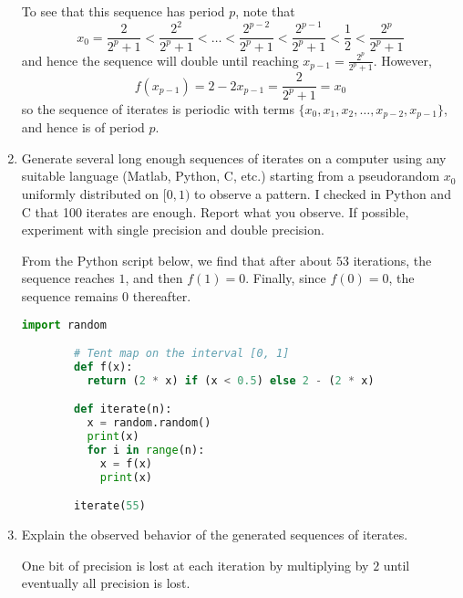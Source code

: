 \documentclass{../../../kin_math}
\begin{document}
\begin{questions}
\begin{enumerate}
\begin{solution}
      To see that this sequence has period $p$, note that
      \begin{equation*}
        x_0 = \frac{2}{2^p + 1} < \frac{2^2}{2^p + 1} < \dots < \frac{2^{p - 2}}{2^p + 1} < \frac{2^{p - 1}}{2^p + 1} < \frac{1}{2} < \frac{2^p}{2^p + 1}
      \end{equation*}
      and hence the sequence will double until reaching $x_{p - 1} = \frac{2^p}{2^p + 1}$. However,
      \begin{equation*}
        f(x_{p - 1}) = 2 - 2x_{p - 1} = \frac{2}{2^p + 1} = x_0
      \end{equation*}
      so the sequence of iterates is periodic with terms $\{x_0, x_1, x_2, \dots, x_{p - 2}, x_{p - 1}\}$, and hence is of period $p$.
    \end{solution}
    \item Generate several long enough sequences of iterates on a computer using any suitable language (Matlab, Python, C, etc.) starting from a pseudorandom $x_0$ uniformly distributed on $[0, 1)$ to observe a pattern. I checked in Python and C that 100 iterates are enough. Report what you observe. If possible, experiment with single precision and double precision.
    \begin{solution}
      From the Python script below, we find that after about $53$ iterations, the sequence reaches $1$, and then $f(1) = 0$. Finally, since $f(0) = 0$, the sequence remains $0$ thereafter.

      \begin{lstlisting}[language=Python]
        import random

        # Tent map on the interval [0, 1]
        def f(x):
          return (2 * x) if (x < 0.5) else 2 - (2 * x)

        def iterate(n):
          x = random.random()
          print(x)
          for i in range(n):
            x = f(x)
            print(x)

        iterate(55)
      \end{lstlisting}
    \end{solution}
    \item Explain the observed behavior of the generated sequences of iterates.
    \begin{solution}
      One bit of precision is lost at each iteration by multiplying by $2$ until eventually all precision is lost.
    \end{solution}
  \end{enumerate}
\end{questions}
\end{document}

